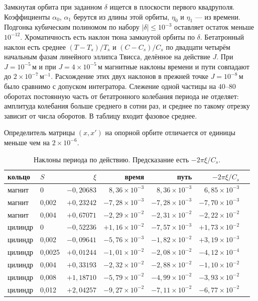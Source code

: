 \documentclass[aps,pra,preprint,a4paper,amsmath,amssymb,longbibliography]{revtex4-2}
\begin{document}
Замкнутая орбита при заданном $\delta$ ищется в плоскости первого квадруполя. Коэффициенты $\alpha_0$, $\alpha_1$ берутся из длины этой орбиты, $\eta_0$ и $\eta_1$ --- из времени. Подгонка кубическим полиномом по набору $|\delta|\le 10^{-3}$ оставляет остаток меньше $10^{-12}$. Хроматичность есть наклон тюна замкнутой орбиты по $\delta$. Бетатронный наклон есть среднее $(T-T_s)/T_s$ и $(C-C_s)/C_s$ по двадцати четырём начальным фазам линейного эллипса Твисса, делённое на действие $J$. При $J=10^{-5}\,\text{м}$ и при $J=4\times 10^{-5}\,\text{м}$ магнитные наклоны времени и пути совпадают до $2\times 10^{-7}\,\text{м}^{-1}$. Расхождение этих двух наклонов в прежней точке $J=10^{-8}\,\text{м}$ было сравнимо с допуском интегратора. Слежение одной частицы на $40$--$80$ оборотах постоянную часть от бетатронного колебания периода не отделяет: амплитуда колебания больше среднего в сотни раз, и среднее по такому отрезку зависит от числа оборотов. В таблицу входит фазовое среднее.

Определитель матрицы $(x,x')$ на опорной орбите отличается от единицы меньше чем на $2\times 10^{-6}$.

\begin{table}[ht]
\centering
\caption{Наклоны периода по действию. Предсказание есть $-2\pi\xi/C_s$.}
\label{tab:es-scan}
\begin{tabular}{llrrrrr}
\hline
кольцо & $S$ & $\xi$ & время & путь & $-2\pi\xi/C_s$ \\
\hline
магнит & 0 & $-0{,}20683$ & $8{,}36\times 10^{-3}$ & $8{,}36\times 10^{-3}$ & $6{,}85\times 10^{-3}$ \\
магнит & 0{,}002 & $+0{,}23242$ & $-7{,}28\times 10^{-3}$ & $-7{,}28\times 10^{-3}$ & $-7{,}70\times 10^{-3}$ \\
магнит & 0{,}004 & $+0{,}67071$ & $-2{,}29\times 10^{-2}$ & $-2{,}31\times 10^{-2}$ & $-2{,}22\times 10^{-2}$ \\
цилиндр & 0 & $-0{,}52236$ & $+1{,}16\times 10^{-2}$ & $-7{,}57\times 10^{-3}$ & $+1{,}73\times 10^{-2}$ \\
цилиндр & 0{,}002 & $-0{,}09641$ & $-5{,}76\times 10^{-3}$ & $-1{,}82\times 10^{-2}$ & $+3{,}19\times 10^{-3}$ \\
цилиндр & 0{,}0025 & $+0{,}01244$ & $-1{,}01\times 10^{-2}$ & $-2{,}08\times 10^{-2}$ & $-4{,}12\times 10^{-4}$ \\
цилиндр & 0{,}004 & $+0{,}33193$ & $-2{,}32\times 10^{-2}$ & $-2{,}88\times 10^{-2}$ & $-1{,}10\times 10^{-2}$ \\
цилиндр & 0{,}008 & $+1{,}18710$ & $-5{,}79\times 10^{-2}$ & $-4{,}99\times 10^{-2}$ & $-3{,}93\times 10^{-2}$ \\
цилиндр & 0{,}012 & $+2{,}04257$ & $-9{,}27\times 10^{-2}$ & $-7{,}11\times 10^{-2}$ & $-6{,}77\times 10^{-2}$ \\
\hline
\end{tabular}
\end{table}
\end{document}
